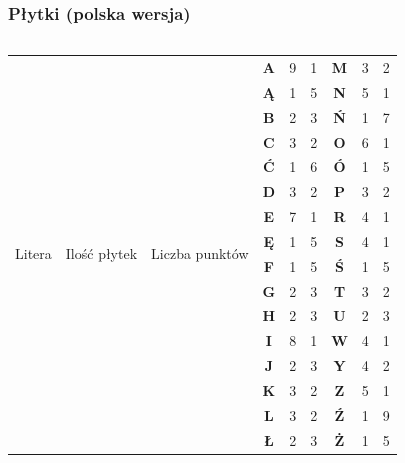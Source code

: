 \documentclass[10pt,a4paper]{beamer}
\begin{document}
\begin{frame}
	\frametitle{Płytki (polska wersja)}
	
	\begin{columns}[onlytextwidth]
		\begin{column}{0.6\textwidth}
			\begin{tabular}{|c|c|c||c|c|c||c|c|c|}
				\hline
				\multirow{16}{*}{
					\begin{sideways}
						Litera
					\end{sideways}	} &
				\multirow{16}{*}{
					\begin{sideways}
						Ilość płytek
					\end{sideways}} & 
				\multirow{16}{*}{
					\begin{sideways}
						Liczba punktów
					\end{sideways}} & \textbf{A} & 9 & 1 & \textbf{M} & 3 & 2 \\
				\cline{4-9}
				&&& \textbf{Ą} & 1 & 5 & \textbf{N} & 5 & 1 \\
				\cline{4-9}
				&&& \textbf{B} & 2 & 3 & \textbf{Ń} & 1 & 7 \\			
				\cline{4-9}
				&&& \textbf{C} & 3 & 2 & \textbf{O} & 6 & 1 \\			
				\cline{4-9}
				&&& \textbf{Ć} & 1 & 6 & \textbf{Ó} & 1 & 5 \\
				\cline{4-9}
				&&& \textbf{D} & 3 & 2 & \textbf{P} & 3 & 2 \\	
				\cline{4-9}
				&&& \textbf{E} & 7 & 1 & \textbf{R} & 4 & 1 \\
				\cline{4-9}
				&&& \textbf{Ę} & 1 & 5 & \textbf{S} & 4 & 1 \\
				\cline{4-9}
				&&& \textbf{F} & 1 & 5 & \textbf{Ś} & 1 & 5 \\
				\cline{4-9}				
				&&& \textbf{G} & 2 & 3 & \textbf{T} & 3 & 2 \\
				\cline{4-9}
				&&& \textbf{H} & 2 & 3 & \textbf{U} & 2 & 3 \\
				\cline{4-9}
				&&& \textbf{I} & 8 & 1 & \textbf{W} & 4 & 1 \\
				\cline{4-9}
				&&& \textbf{J} & 2 & 3 & \textbf{Y} & 4 & 2 \\
				\cline{4-9}
				&&& \textbf{K} & 3 & 2 & \textbf{Z} & 5 & 1 \\
				\cline{4-9}
				&&& \textbf{L} & 3 & 2 & \textbf{Ź} & 1 & 9 \\
				\cline{4-9}
				&&& \textbf{Ł} & 2 & 3 & \textbf{Ż} & 1 & 5 \\
				\hline
			\end{tabular}

\end{column}
\end{columns}
\end{frame}
\end{document}
